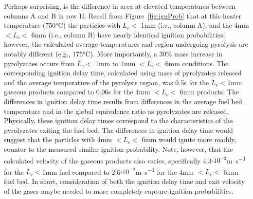     Perhaps surprising, is the difference in area at elevated temperatures between columns A and B in row II. Recall from Figure~\ref{fig:ignProb} that at this heater temperature (750\si{\celsius}) the particles with $L_{c}<$ 1\si{\milli\meter} (i.e., column A), and the 4\si{\milli\meter} $<L_{c}<$ 6\si{\milli\meter} (i.e., column B) have nearly identical ignition probabilities; however, the calculated average temperatures and region undergoing pyrolysis are notably different (e.g., 175\si{\celsius}).  More importantly, a 30\% mass increase in pyrolyzates occurs from $L_{c}<$ 1\si{\milli\meter} to 4\si{\milli\meter} $<L_{c}<$ 6\si{\milli\meter} conditions.  The corresponding ignition delay time, calculated using mass of pyrolyzates released and the average temperature of the pyrolysis region, was 0.5\si{\second} for the $L_{c}<$1\si{\milli\meter} gaseous products compared to 0.06\si{\second} for the 4\si{\milli\meter} $<L_{c}<$ 6\si{\milli\meter} products. The differences in ignition delay time results from differences in the average fuel bed temperature and in the global equivalence ratio as pyrolyzates are released. Physically, these ignition delay times correspond to the characteristics of the pyrolyzates exiting the fuel bed. The differences in ignition delay time would suggest that the particles with 4\si{\milli\meter} $<L_{c}<$ 6\si{\milli\meter} would ignite more readily, counter to the measured similar ignition probability.  Note, however, that the calculated velocity of the gaseous products also varies, specifically 4.3$\cdot10^{-3}$\si{\meter\per\second} for the $L_{c}<$1\si{\milli\meter} fuel compared to 2.6$\cdot10^{-2}$\si{\meter\per\second} for the 4\si{\milli\meter} $<L_{c}<$ 6\si{\milli\meter} fuel bed.  In short, consideration of both the ignition delay time and exit velocity of the gases maybe needed to more completely capture ignition probabilities.

